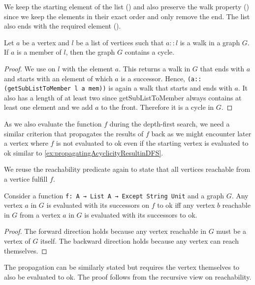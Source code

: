 \noindent We keep the starting element of the list (\getSubListToMemberPreservesFront) and also preserve the walk property (\getSubListToMemberPreservesWalk) since we keep the elements in their exact order and only remove the end. The list also ends with the required element (\getSubListToMemberEndsWithElement). 

\begin{lemma}[\frontRepetitionInWalkImpliesCycle]
  Let $a$ be a vertex and $l$ be a list of vertices such that $a::l$ is a walk in a graph $G$. If $a$ is a member of $l$, then the graph $G$ contains a cycle.
\end{lemma}
\begin{proof}
  We use \getSubListToMember on $l$ with the element $a$. This returns a walk in $G$ that ends with $a$ and starts with an element of which $a$ is a successor. Hence, \lstinline|(a::(getSubListToMember l a mem))| is again a walk that starts and ends with $a$. It also has a length of at least two since getSubListToMember always contains at least one element and we add $a$ to the front. Therefore it is a cycle in $G$.
\end{proof}

As we also evaluate the function $f$ during the depth-first search, we need a similar criterion that propagates the results of $f$ back as we might encounter later a vertex where $f$ is not evaluated to ok even if the starting vertex is evaluated to ok similar to \cref{ex:propagatingAcyclicityResultinDFS}.

We reuse the reachability predicate again to state that all vertices reachable from a vertice fulfill $f$.

\begin{lemma}[\allTrueIfAllCanReachTrue]\label{lem:allTrueIfAllCanReachTrue}
  Consider a function \lstinline|f: A → List A → Except String Unit| and a graph $G$. Any vertex $a$ in $G$ is evaluated with its successors on $f$ to ok iff any vertex $b$ reachable in $G$ from a vertex $a$ in $G$ is evaluated with its successors to ok.
\end{lemma}
\begin{proof}
  The forward direction holds because any vertex reachable in $G$ must be a vertex of $G$ itself. The backward direction holds because any vertex can reach themselves.
\end{proof}

The propagation can be similarly stated but requires the vertex themselves to also be evaluated to ok. The proof follows from the recursive view on reachability.

